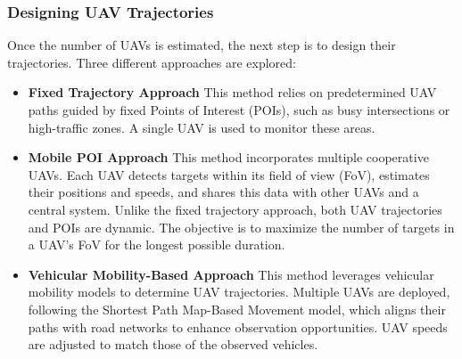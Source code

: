 

\subsubsection{Designing UAV Trajectories}
Once the number of UAVs is estimated, the next step is to design their trajectories. Three different approaches are explored:

\begin{itemize}
    \item \textbf{Fixed Trajectory Approach} This method relies on predetermined UAV paths guided by fixed Points of Interest (POIs), such as busy intersections or high-traffic zones. A single UAV is used to monitor these areas.
    \item \textbf{Mobile POI Approach} This method incorporates multiple cooperative UAVs. Each UAV detects targets within its field of view (FoV), estimates their positions and speeds, and shares this data with other UAVs and a central system. Unlike the fixed trajectory approach, both UAV trajectories and POIs are dynamic. The objective is to maximize the number of targets in a UAV's FoV for the longest possible duration.
    \item \textbf{Vehicular Mobility-Based Approach} This method leverages vehicular mobility models to determine UAV trajectories. Multiple UAVs are deployed, following the Shortest Path Map-Based Movement model, which aligns their paths with road networks to enhance observation opportunities. UAV speeds are adjusted to match those of the observed vehicles.
\end{itemize}



